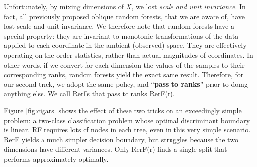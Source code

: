 \documentclass{article} %
\begin{document}
Unfortunately, by mixing dimensions of $X$, we lost {\em{scale and unit invariance}}.  In fact, all previously proposed oblique random forests, that we are aware of, have lost scale and unit invariance.  We therefore note that random forests have a special property: they are invariant to monotonic transformations of the data applied to each coordinate in the ambient (observed) space.  They are effectively operating on the order statistics, rather than actual magnitudes of coordinates.  In other words, if we convert for each dimension the values of the samples to their corresponding ranks, random forests yield the exact same result. Therefore, for our second trick, we adopt the same policy, and ``{\bf{pass to ranks}}'' prior to doing anything else. We call RerFs that pass to ranks RerF(r).

Figure \ref{fig:cigars} shows the effect of these two tricks on an exceedingly simple problem: a two-class classification problem whose optimal discriminant boundary is linear.  RF requires lots of nodes in each tree,  even in this very simple scenario. RerF yields a much simpler decision boundary, but struggles because the two dimensions have different variances.  Only RerF(r) finds a single split that performs approximately optimally. 

\end{document}
